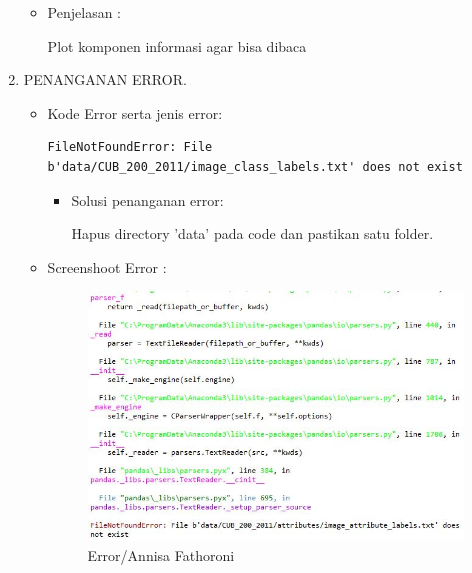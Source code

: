 \begin{enumerate}
\begin{itemize}
\item Penjelasan :

Plot komponen informasi agar bisa dibaca

\end{itemize}

\item PENANGANAN ERROR.
\begin{itemize}
\item Kode Error serta jenis error:
 
\begin{verbatim}
FileNotFoundError: File b'data/CUB_200_2011/image_class_labels.txt' does not exist
\end{verbatim}

\begin{itemize}
\item Solusi penanganan error:

Hapus directory 'data' pada code dan pastikan satu folder.

\end{itemize}
\item Screenshoot Error :

\begin{figure}[ht]
\centering
\includegraphics[scale=0.6]{figures/Error.jpg}
\caption{Error/Annisa Fathoroni}
\label{contoh}
\end{figure}

\end{itemize}

\end{enumerate}